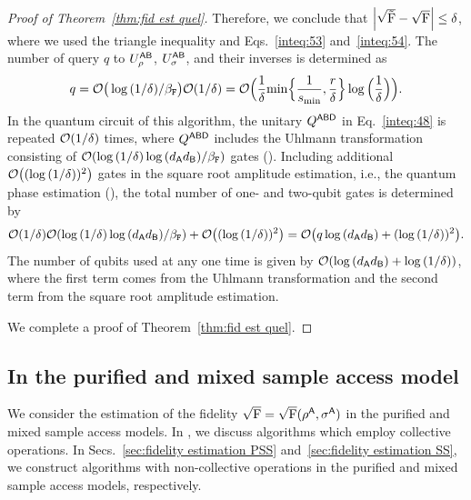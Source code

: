 \begin{proof}[Proof of Theorem~\ref{thm:fid est quel}]
Therefore, we conclude that $\Big|\sqrt{\tilde{{\mathrm{F}}}} - \sqrt{{\mathrm{F}}}\Big| \leq \delta$, where we used the triangle inequality and Eqs.~\eqref{inteq:53} and~\eqref{inteq:54}.
The number of query $q$ to $U_\rho^{{\mathsf{A}}{\mathsf{B}}}$, $U_\sigma^{{\mathsf{A}}{\mathsf{B}}}$, and their inverses is determined as
\begin{align}
\label{inteq:58}
    q = {\mathcal{O}}\big(\log{(1/\delta)}/\beta_{\mathtt{F}}\big) {\mathcal{O}}(1/\delta) =
    {\mathcal{O}}\Big(\frac{1}{\delta}{\rm min}\Big\{\frac{1}{s_{\rm min}}, \frac{r}{\delta}\Big\}\log{\Big(\frac{1}{\delta}\Big)}\Big).
\end{align}
In the quantum circuit of this algorithm, the unitary $Q^{{\mathsf{A}}{\mathsf{B}}{\mathsf{D}}}$ in Eq.~\eqref{inteq:48} is repeated ${\mathcal{O}}(1/\delta)$ times, where $Q^{{\mathsf{A}}{\mathsf{B}}{\mathsf{D}}}$ includes the Uhlmann transformation consisting of ${\mathcal{O}}(\log{(1/\delta)\log{(d_{\mathsf{A}}d_{\mathsf{B}})}/\beta_{\mathtt{F}}})$ gates ().
Including additional ${\mathcal{O}}\big((\log{(1/\delta)})^2\big)$ gates in the square root amplitude estimation, i.e., the quantum phase estimation (), the total number of one- and two-qubit gates is determined by
\begin{align}
    {\mathcal{O}}(1/\delta){\mathcal{O}}(\log{(1/\delta)\log{(d_{\mathsf{A}}d_{\mathsf{B}})}/\beta_{\mathtt{F}}}) + {\mathcal{O}}\big((\log{(1/\delta)})^2\big)
    = {\mathcal{O}}\big(q\log{(d_{\mathsf{A}}d_{\mathsf{B}})} + (\log{(1/\delta)})^2\big).
\end{align}
The number of qubits used at any one time is given by ${\mathcal{O}}(\log{(d_{\mathsf{A}}d_{\mathsf{B}})} + \log{(1/\delta)})$,
where the first term comes from the Uhlmann transformation and the second term from the square root amplitude estimation.

We complete a proof of Theorem~\ref{thm:fid est quel}.






\end{proof}






\subsection{In the purified and mixed sample access model}
\label{sec:fidelity estimation purif and mixed sample}


We consider the estimation of the fidelity $\sqrt{{\mathrm{F}}} = \sqrt{{\mathrm{F}}}(\rho^{\mathsf{A}}, \sigma^{\mathsf{A}})$ in the purified and mixed sample access models. In , we discuss algorithms which employ collective operations. In Secs.~\ref{sec:fidelity estimation PSS} and~\ref{sec:fidelity estimation SS}, we construct algorithms with non-collective operations in the purified and mixed sample access models, respectively.

